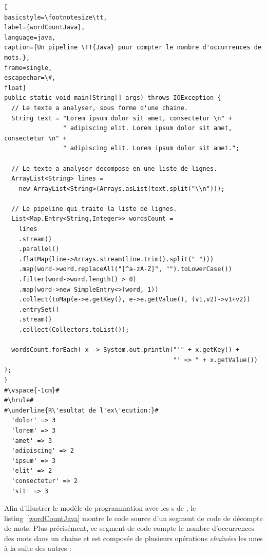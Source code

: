 \begin{lstlisting}[
basicstyle=\footnotesize\tt,
label={wordCountJava},
language=java,
caption={Un pipeline \TT{Java} pour compter le nombre d'occurrences de mots.},
frame=single,
escapechar=\#,
float]
public static void main(String[] args) throws IOException {
  // Le texte a analyser, sous forme d'une chaine.
  String text = "Lorem ipsum dolor sit amet, consectetur \n" +
                " adipiscing elit. Lorem ipsum dolor sit amet, consectetur \n" +
                " adipiscing elit. Lorem ipsum dolor sit amet.";

  // Le texte a analyser decompose en une liste de lignes.
  ArrayList<String> lines = 
	new ArrayList<String>(Arrays.asList(text.split("\\n")));

  // Le pipeline qui traite la liste de lignes.	
  List<Map.Entry<String,Integer>> wordsCount = 
    lines
    .stream()
    .parallel()
    .flatMap(line->Arrays.stream(line.trim().split(" ")))
    .map(word->word.replaceAll("[^a-zA-Z]", "").toLowerCase())
    .filter(word->word.length() > 0)
    .map(word->new SimpleEntry<>(word, 1))
    .collect(toMap(e->e.getKey(), e->e.getValue(), (v1,v2)->v1+v2))
    .entrySet()
    .stream()
    .collect(Collectors.toList());   	
  
  wordsCount.forEach( x -> System.out.println("'" + x.getKey() + 
                                              "' => " + x.getValue()) );
}
#\vspace{-1cm}#
#\hrule#
#\underline{R\'esultat de l'ex\'ecution:}#
  'dolor' => 3
  'lorem' => 3
  'amet' => 3
  'adipiscing' => 2
  'ipsum' => 3
  'elit' => 2
  'consectetur' => 2
  'sit' => 3
\end{lstlisting}




Afin d'illustrer le mod\`ele de programmation avec les s de , le listing~\ref{wordCountJava} montre le code source d'un segment de code  de d\'ecompte de mots. Plus pr\'ecis\'ement, ce segment de code compte le nombre d'occurrences des mots dans un chaine et est compos\'ee de plusieurs op\'erations \emph{cha\^in\'ees} les unes \`a la suite des autres :

